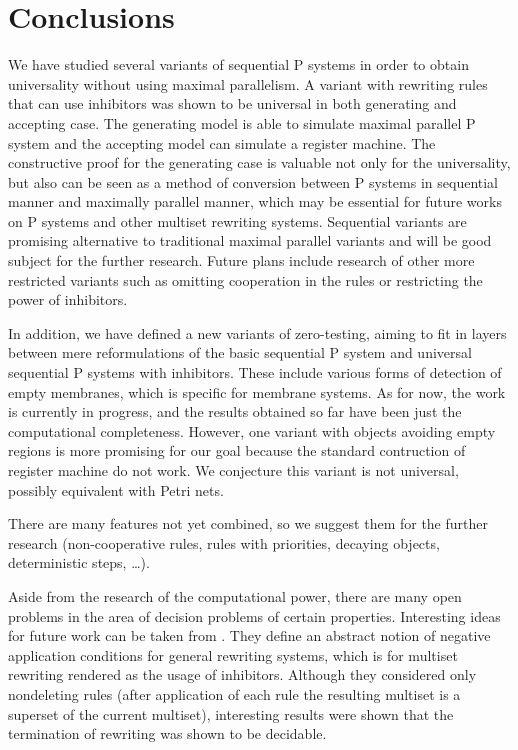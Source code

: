 \chapter*{Conclusions}
We have studied several variants of sequential P systems in order to obtain universality without using maximal parallelism. A variant with rewriting rules that can use inhibitors was shown to be universal in both generating and accepting case. The generating model is able to simulate maximal parallel P system and the accepting model can simulate a register machine.
The constructive proof for the generating case is valuable not only for the universality, but also can be seen as a method of conversion between P systems in sequential manner and maximally parallel manner, which may be essential for future works on P systems and other multiset rewriting systems. Sequential variants are promising alternative to traditional maximal parallel variants and will be good subject for the further research. Future plans include research of other more restricted variants such as omitting cooperation in the rules or restricting the power of inhibitors.

In addition, we have defined a new variants of zero-testing, aiming to fit in layers between mere reformulations of the basic sequential P system and universal sequential P systems with inhibitors. These include various forms of detection of empty membranes, which is specific for membrane systems. As for now, the work is currently in progress, and the results obtained so far have been just the computational completeness. However, one variant with objects avoiding empty regions is more promising for our goal because the standard contruction of register machine do not work. We conjecture this variant is not universal, possibly equivalent with Petri nets.

There are many features not yet combined, so we suggest them for the further research (non-cooperative rules, rules with priorities, decaying objects, deterministic steps, \ldots).

Aside from the research of the computational power, there are many open problems in the area of decision problems of certain properties. Interesting ideas for future work can be taken from \cite{Bottoni06Inhibitors}. They define an abstract notion of negative application conditions for general rewriting systems, which is for multiset rewriting rendered as the usage of inhibitors. Although they considered only nondeleting rules (after application of each rule the resulting multiset is a superset of the current multiset), interesting results were shown that the termination of rewriting was shown to be decidable.

